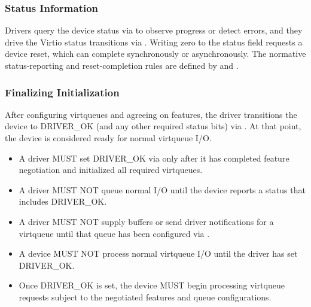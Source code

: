 \subsubsection{Status Information}
\label{sec:Virtio Transport Options / Virtio Over Messages / Device Initialization / Status Information}

Drivers query the device status via  to observe
progress or detect errors, and they drive the Virtio status transitions via
. Writing zero to the status field requests a device
reset, which can complete synchronously or asynchronously. The normative
status-reporting and reset-completion rules are defined by
 and .

\subsubsection{Finalizing Initialization}

After configuring virtqueues and agreeing on features, the driver transitions
the device to DRIVER\_OK (and any other required status bits) via
. At that point, the device is considered ready for
normal virtqueue I/O.

\begin{itemize}
  \item A driver MUST set DRIVER\_OK via  only after
        it has completed feature negotiation and initialized all required
        virtqueues.
  \item A driver MUST NOT queue normal I/O until the device reports a status
        that includes DRIVER\_OK.
  \item A driver MUST NOT supply buffers or send driver notifications for a
        virtqueue until that queue has been configured via .
\end{itemize}

\begin{itemize}
  \item A device MUST NOT process normal virtqueue I/O until the driver has set
        DRIVER\_OK.
  \item Once DRIVER\_OK is set, the device MUST begin processing virtqueue
        requests subject to the negotiated features and queue configurations.
\end{itemize}

